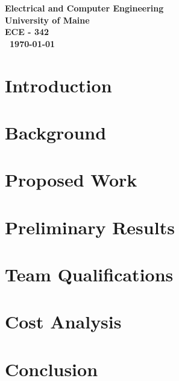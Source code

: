 \documentclass{article}
\begin{document}
\begin{titlepage}
\begin{center}
        
        \vspace{02.5cm}
        \textbf{
        Electrical and Computer Engineering\\
        University of Maine\\
        ECE - 342\\\ \today}
    \vspace{.5cm}
    
    \end{center}
\end{titlepage}


\tableofcontents

\newpage

\newpage
\listoffigures
\listoftables
\newpage 
\clearpage




\section{Introduction}

  
 
  \section{Background}
    
  
   \section{Proposed Work}
   	 
 	
    
  \section{Preliminary Results}
  	

    
  \section{Team Qualifications}
     
    
    
    
   \section{Cost Analysis}
   	
    \section{Conclusion}
        
\end{document}
